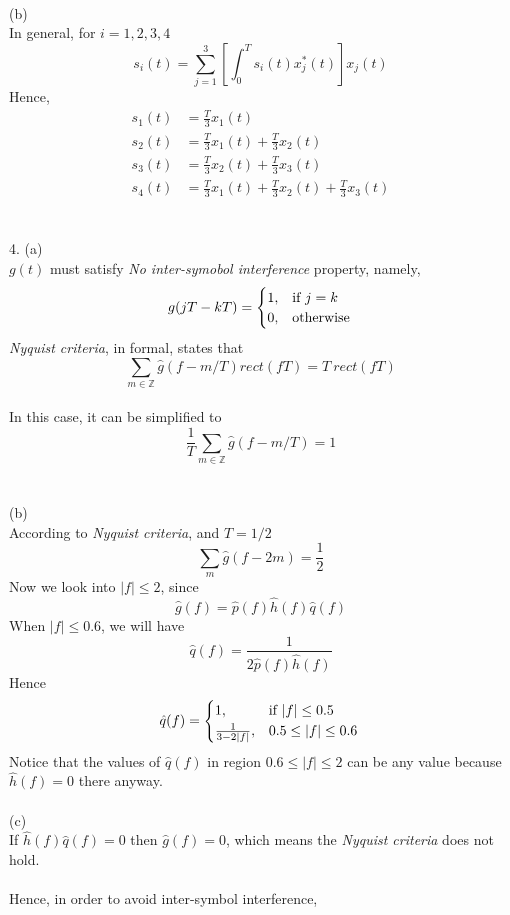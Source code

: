 \documentclass [12pt] {article}
\begin{document}
\begin{spacing}{1.5}
~\\
(b)\\
In general, for $i=1,2,3,4$
$$ s_i(t) = \sum_{j=1}^{3}[\int_0^T s_i(t)x_j^*(t)]x_{j}(t)$$
Hence,
\begin{align*}
s_1(t) &= \frac{T}{3} x_1(t)\\
s_2(t) &= \frac{T}{3} x_1(t) +\frac{T}{3} x_2(t)\\
s_3(t) &= \frac{T}{3} x_2(t) + \frac{T}{3} x_3(t)\\
s_4(t) &= \frac{T}{3} x_1(t) + \frac{T}{3} x_2(t) + \frac{T}{3} x_3(t)
\end{align*}
~\\
~\\
4. (a)\\
$g(t)$ must satisfy \emph{No inter-symobol interference} property, namely, 
$$ g(jT-kT)=\begin{cases}
    1, & \text{if } j=k\\
    0,              & \text{otherwise}
\end{cases}\\$$
\emph{Nyquist criteria}, in formal, states that\\
$$ \sum_{m \in \mathbb{Z}} \hat{g}(f-m/T)rect(fT) = T \: rect(fT)$$\\
In this case, it can be simplified to
$$ \frac{1}{T} \sum_{m \in \mathbb{Z}} \hat{g}(f-m/T) = 1$$
~\\
\pagebreak
~\\
(b)\\
According to \emph{Nyquist criteria}, and $T = 1/2$
$$ \sum_{m} \hat{g}(f-2m) = \frac{1}{2}$$
Now we look into $|f|\leq 2$, since
$$\hat{g}(f) = \hat{p}(f)\hat{h}(f)\hat{q}(f)$$
When $|f|\leq 0.6$, we will have
$$\hat{q}(f) = \frac{1}{2\hat{p}(f)\hat{h}(f)}$$
Hence
$$ 
\hat{q}(f) = \begin{cases}
    1, & \text{if } |f| \leq 0.5\\
    \frac{1}{3-2|f|},              & 0.5 \leq |f| \leq 0.6
\end{cases}\\
$$
Notice that the values of $\hat{q}(f)$ in region $0.6 \leq |f| \leq 2$ can be any value because $\hat{h}(f) = 0$ there anyway.\\
~\\
(c)\\
If $\hat{h}(f)\hat{q}(f)=0$ then $\hat{g}(f)=0$, which means the \emph{Nyquist criteria} does not hold.\\
~\\
Hence, in order to avoid inter-symbol interference, \\

\end{spacing}
\end{document}
